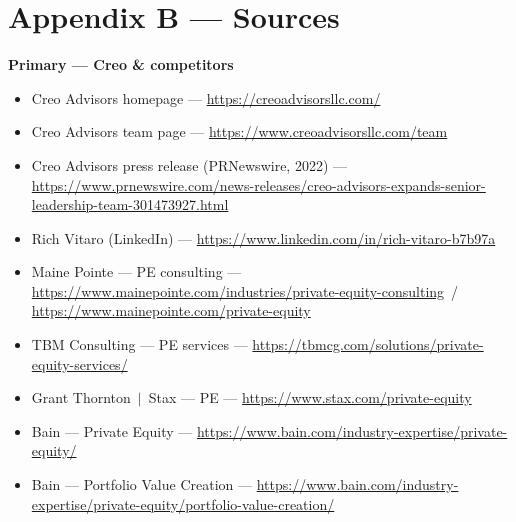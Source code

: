 \documentclass[11pt]{article}
\begin{document}
\section{Appendix B --- Sources}
\small
\textbf{Primary --- Creo \& competitors}
\begin{itemize}
  \item Creo Advisors homepage --- \url{https://creoadvisorsllc.com/}
  \item Creo Advisors team page --- \url{https://www.creoadvisorsllc.com/team}
  \item Creo Advisors press release (PRNewswire, 2022) --- \url{https://www.prnewswire.com/news-releases/creo-advisors-expands-senior-leadership-team-301473927.html}
  \item Rich Vitaro (LinkedIn) --- \url{https://www.linkedin.com/in/rich-vitaro-b7b97a}
  \item Maine Pointe --- PE consulting --- \url{https://www.mainepointe.com/industries/private-equity-consulting} \,/\, \url{https://www.mainepointe.com/private-equity}
  \item TBM Consulting --- PE services --- \url{https://tbmcg.com/solutions/private-equity-services/}
  \item Grant Thornton~$\vert$~Stax --- PE --- \url{https://www.stax.com/private-equity}
  \item Bain --- Private Equity --- \url{https://www.bain.com/industry-expertise/private-equity/}
  \item Bain --- Portfolio Value Creation --- \url{https://www.bain.com/industry-expertise/private-equity/portfolio-value-creation/}
\end{itemize}
\end{document}
